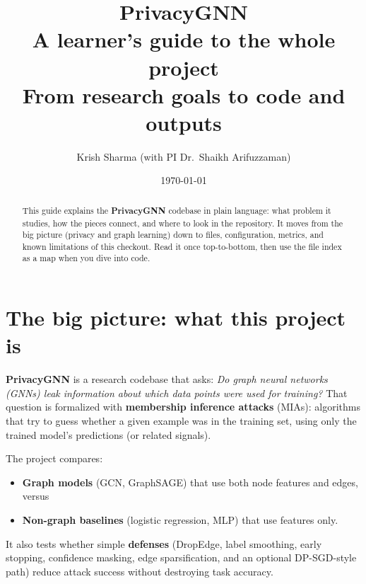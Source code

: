 \documentclass[11pt,a4paper]{article}
\title{\textbf{PrivacyGNN}\\[0.4em]
\large A learner's guide to the whole project\\[0.2em]
\normalsize From research goals to code and outputs}
\author{Krish Sharma (with PI Dr.\ Shaikh Arifuzzaman)}
\date{\today}
\begin{document}
\maketitle
\begin{abstract}
\noindent
This guide explains the \textbf{PrivacyGNN} codebase in plain language: what problem it studies, how the pieces connect, and where to look in the repository. It moves from the big picture (privacy and graph learning) down to files, configuration, metrics, and known limitations of this checkout. Read it once top-to-bottom, then use the file index as a map when you dive into code.
\end{abstract}
\tableofcontents
\newpage

\section{The big picture: what this project is}

\textbf{PrivacyGNN} is a research codebase that asks: \emph{Do graph neural networks (GNNs) leak information about which data points were used for training?} That question is formalized with \textbf{membership inference attacks} (MIAs): algorithms that try to guess whether a given example was in the training set, using only the trained model's predictions (or related signals).

The project compares:
\begin{itemize}
  \item \textbf{Graph models} (GCN, GraphSAGE) that use both node features and edges, versus
  \item \textbf{Non-graph baselines} (logistic regression, MLP) that use features only.
\end{itemize}
It also tests whether simple \textbf{defenses} (DropEdge, label smoothing, early stopping, confidence masking, edge sparsification, and an optional DP-SGD-style path) reduce attack success without destroying task accuracy.
\end{document}
